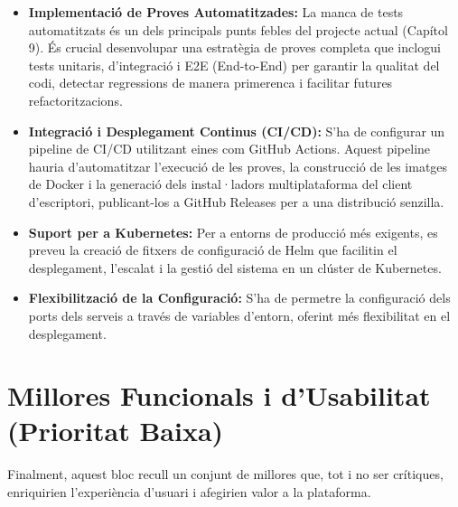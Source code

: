 \begin{itemize}
    \item \textbf{Implementació de Proves Automatitzades:} La manca de tests automatitzats és un dels principals punts febles del projecte actual (Capítol 9). És crucial desenvolupar una estratègia de proves completa que inclogui tests unitaris, d'integració i E2E (End-to-End) per garantir la qualitat del codi, detectar regressions de manera primerenca i facilitar futures refactoritzacions.
    
    \item \textbf{Integració i Desplegament Continus (CI/CD):} S'ha de configurar un pipeline de CI/CD utilitzant eines com GitHub Actions. Aquest pipeline hauria d'automatitzar l'execució de les proves, la construcció de les imatges de Docker i la generació dels instal·ladors multiplataforma del client d'escriptori, publicant-los a GitHub Releases per a una distribució senzilla.
    
    \item \textbf{Suport per a Kubernetes:} Per a entorns de producció més exigents, es preveu la creació de fitxers de configuració de Helm que facilitin el desplegament, l'escalat i la gestió del sistema en un clúster de Kubernetes.

    \item \textbf{Flexibilització de la Configuració:} S'ha de permetre la configuració dels ports dels serveis a través de variables d'entorn, oferint més flexibilitat en el desplegament.
\end{itemize}

\section{Millores Funcionals i d'Usabilitat (Prioritat Baixa)}

Finalment, aquest bloc recull un conjunt de millores que, tot i no ser crítiques, enriquirien l'experiència d'usuari i afegirien valor a la plataforma.

